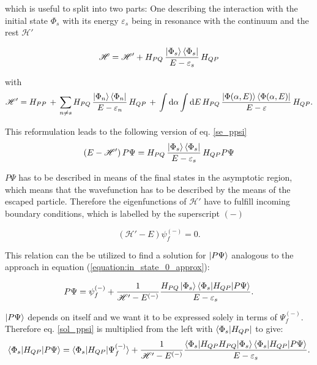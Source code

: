 which is useful to split into two parts: One describing the interaction with the
initial state $\Phi_s$ with its energy $\varepsilon_s$ being in resonance with
the continuum and the rest
$\mathscr{H}'$

\begin{equation}
  \mathscr{H} = \mathscr{H}' + H_{PQ} \,\frac{\ket{\Phi_s}\bra{\Phi_s}}{E-\varepsilon_s}\, H_{QP}
\end{equation}

with
\begin{equation}
  \mathscr{H}' = H_{PP}\, + \,
  \sum\limits_{n\ne s} H_{PQ} \,\frac{\ket{\Phi_n}\bra{\Phi_n}}{E-\varepsilon_n}
  \, H_{QP} \,+\,
  \int \mathrm{d}\alpha \int\mathrm{d}E \,H_{PQ} \,
  \frac{\ket{\Phi(\alpha,E)}\bra{\Phi(\alpha,E)}}{E-\varepsilon} \, H_{QP} .
\end{equation}

This reformulation leads to the following version of eq. \ref{se_ppsi}
\begin{equation}
  (E - \mathscr{H}')\, P \Psi =
   H_{PQ} \,\frac{\ket{\Phi_s}\bra{\Phi_s}}{E-\varepsilon_s}\, H_{QP} P \Psi %
\end{equation}

$P \Psi$ has to be described in means of the final states in the asymptotic
region, which means that the wavefunction has to be described by the means
of the escaped particle. Therefore
the eigenfunctions of $\mathscr{H}'$ have to fulfill incoming boundary conditions,
which is labelled by the superscript $(-)$

\begin{equation}
  (\mathscr{H}'-E) \psi_f^{(-)} = 0 \label{sol_outg} .
\end{equation}

This relation can the be utilized to find a solution for $\ket{P \Psi}$ analogous
to the approach in equation (\ref{equation:in_state_0_approx}):

\begin{equation}\label{sol_ppsi}
  P \Psi = \psi_f^{(-)} + \frac{1}{\mathscr{H}' - E^{(-)}}
           \frac{H_{PQ}\ket{\Phi_s}
           \braket{\Phi_s|H_{QP}|P\Psi}}{E - \varepsilon_s} .
\end{equation}

$\ket{P \Psi}$ depends on itself and we want it to be expressed solely in terms
of $\Psi_f^{(-)}$. Therefore 
eq. \ref{sol_ppsi}
is multiplied from the left with $\bra{\Phi_s|H_{QP}}$ to give:
\begin{equation}
  \braket{\Phi_s|H_{QP}|P\Psi} = \braket{\Phi_s|H_{QP}|\Psi_f^{(-)}} +
  \frac{1}{\mathscr{H}' - E^{(-)}}
  \frac{\braket{\Phi_s|H_{QP}H_{PQ}|\Phi_s} \braket{\Phi_s|H_{QP}|P\Psi}}
       {E - \varepsilon_s}  \label{s_ppsi} .
\end {equation}

